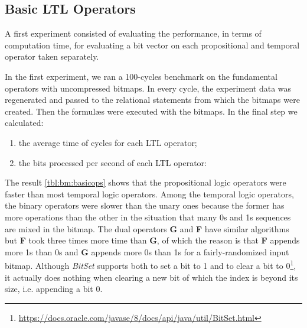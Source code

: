 
\subsection{Basic LTL Operators} %

A first experiment consisted of evaluating the performance, in terms of computation time, for evaluating a bit vector on each propositional and temporal operator taken separately.

In the first experiment, we ran a 100-cycles benchmark on the fundamental operators with uncompressed bitmaps. In every cycle, the experiment data was regenerated and passed to the relational statements from which the bitmaps were created. Then the formul\ae{}s were executed with the bitmaps. In the final step we calculated:
\begin{enumerate}
\item the average time of cycles for each LTL operator;
\item the bits processed per second of each LTL operator: \newline
\begin{small}
 \label{eq:bps}
\end{small}
\end{enumerate}

The result \ref{tbl:bm:basicops} shows that the propositional logic operators were faster than most temporal logic operators. Among the temporal logic operators, the binary operators were slower than the unary ones because the former has more operations than the other in the situation that many 0s and 1s sequences are mixed in the bitmap. The dual operators \textbf{G} and \textbf{F} have similar algorithms but \textbf{F} took three times more time than \textbf{G}, of which the reason is that \textbf{F} appends more 1s than 0s and \textbf{G} appends more 0s than 1s for a fairly-randomized input bitmap. Although \emph{BitSet} supports both to set a bit to 1 and to clear a bit to 0\footnote{\url{https://docs.oracle.com/javase/8/docs/api/java/util/BitSet.html}}, it actually does nothing when clearing a new bit of which the index is beyond its size, i.e. appending a bit 0.

